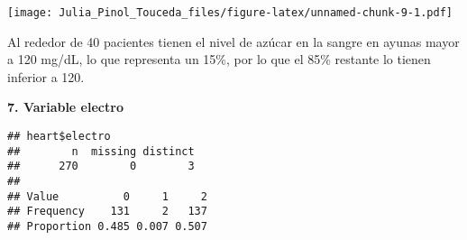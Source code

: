 \documentclass[]{article}
\newenvironment{Shaded}{\begin{snugshade}}{\end{snugshade}}
\newcommand{\KeywordTok}[1]{\textcolor[rgb]{0.13,0.29,0.53}{\textbf{#1}}}
\newcommand{\DataTypeTok}[1]{\textcolor[rgb]{0.13,0.29,0.53}{#1}}
\newcommand{\DecValTok}[1]{\textcolor[rgb]{0.00,0.00,0.81}{#1}}
\newcommand{\StringTok}[1]{\textcolor[rgb]{0.31,0.60,0.02}{#1}}
\newcommand{\OperatorTok}[1]{\textcolor[rgb]{0.81,0.36,0.00}{\textbf{#1}}}
\newcommand{\NormalTok}[1]{#1}
\begin{document}
\begin{Shaded}
\end{Shaded}

\texttt{[image: Julia\_Pinol\_Touceda\_files/figure-latex/unnamed-chunk-9-1.pdf]}

Al rededor de 40 pacientes tienen el nivel de azúcar en la sangre en
ayunas mayor a 120 mg/dL, lo que representa un 15\%, por lo que el 85\%
restante lo tienen inferior a 120.

\textbf{7. Variable electro}

\begin{Shaded}
\end{Shaded}

\begin{verbatim}
## heart$electro 
##        n  missing distinct 
##      270        0        3 
##                             
## Value          0     1     2
## Frequency    131     2   137
## Proportion 0.485 0.007 0.507
\end{verbatim}

\begin{Shaded}
\end{Shaded}
\end{document}
